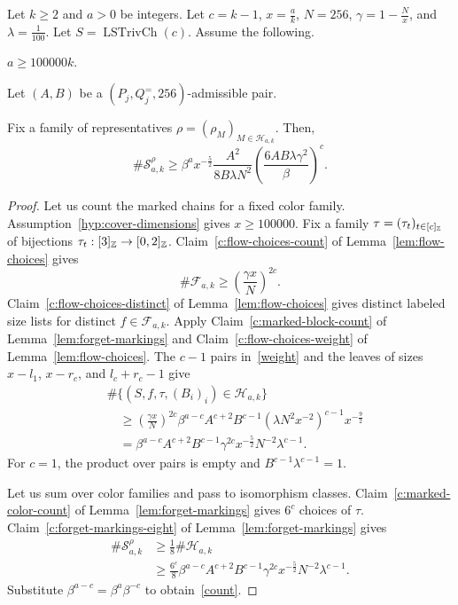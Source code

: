 \begin{proposition}\label{prop:cover-count}
Let $k\ge2$ and $a>0$ be integers. Let $c=k-1$, $x=\frac ak$,
$N=256$, $\gamma=1-\frac Nx$, and $\lambda=\frac1{100}$.
Let $S=\operatorname{LSTrivCh}(c)$.
Assume the following.
\begin{hypotheses}
\item\label{hyp:cover-dimensions} $a\ge100000k$.
\item\label{hyp:cover-slot-bounds} Let $(A,B)$ be a $(P_j,Q_j^{=},256)$-admissible pair.
\end{hypotheses}
Fix a family of representatives $\rho=(\rho_M)_{M\in\mathcal H_{a,k}}$.
Then,
\begin{equation}
\#\mathcal S_{a,k}^\rho\ge\beta^a x^{-\frac{5}{2}}\frac{A^2}{8B\lambda N^2}
 \left(\frac{6AB\lambda\gamma^2}{\beta}\right)^c.\label{count}
\end{equation}
\end{proposition}
\begin{proof}
Let us count the marked chains for a fixed color family.
Assumption~\ref{hyp:cover-dimensions} gives $x\ge100000$.
Fix a family $\tau=(\tau_t)_{t\in[c]_{\mathbb Z}}$ of bijections
$\tau_t:[3]_{\mathbb Z}\to[0,2]_{\mathbb Z}$.
Claim~\ref{c:flow-choices-count} of Lemma~\ref{lem:flow-choices} gives
\[
 \#\mathcal F_{a,k}\ge\left(\frac{\gamma x}{N}\right)^{2c}.
\]
Claim~\ref{c:flow-choices-distinct} of Lemma~\ref{lem:flow-choices}
gives distinct labeled size lists for distinct $f\in\mathcal F_{a,k}$.
Apply Claim~\ref{c:marked-block-count} of Lemma~\ref{lem:forget-markings}
and Claim~\ref{c:flow-choices-weight} of Lemma~\ref{lem:flow-choices}.
The $c-1$ pairs in~\eqref{weight} and the leaves of sizes
$x-l_1$, $x-r_c$, and $l_c+r_c-1$ give
\[
\begin{aligned}
 &\#\{(S,f,\tau,(B_i)_i)\in\mathcal H_{a,k}\}\\
 &\quad\ge\left(\frac{\gamma x}{N}\right)^{2c}
   \beta^{a-c}A^{c+2}B^{c-1}
   (\lambda N^2x^{-2})^{c-1}x^{-\frac92}\\
 &\quad=\beta^{a-c}A^{c+2}B^{c-1}\gamma^{2c}x^{-\frac52}N^{-2}\lambda^{c-1}.
\end{aligned}
\]
For $c=1$, the product over pairs is empty and $B^{c-1}\lambda^{c-1}=1$.

Let us sum over color families and pass to isomorphism classes.
Claim~\ref{c:marked-color-count} of Lemma~\ref{lem:forget-markings}
gives $6^c$ choices of $\tau$.
Claim~\ref{c:forget-markings-eight} of Lemma~\ref{lem:forget-markings} gives
\[
\begin{aligned}
 \#\mathcal S_{a,k}^\rho
 &\ge\frac18\#\mathcal H_{a,k}\\
 &\ge\frac{6^c}{8}\beta^{a-c}A^{c+2}B^{c-1}
 \gamma^{2c}x^{-\frac52}N^{-2}\lambda^{c-1}.
\end{aligned}
\]
Substitute $\beta^{a-c}=\beta^a\beta^{-c}$ to obtain~\eqref{count}.
\end{proof}

